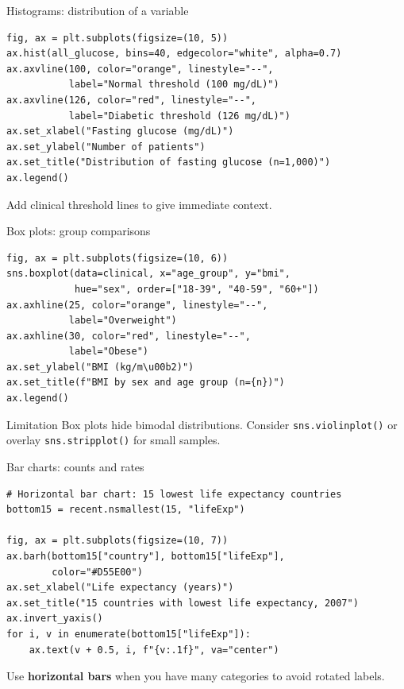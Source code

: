 \documentclass[aspectratio=169,11pt]{beamer}
\begin{document}
\begin{frame}[fragile]{Histograms: distribution of a variable}
\begin{verbatim}
fig, ax = plt.subplots(figsize=(10, 5))
ax.hist(all_glucose, bins=40, edgecolor="white", alpha=0.7)
ax.axvline(100, color="orange", linestyle="--",
           label="Normal threshold (100 mg/dL)")
ax.axvline(126, color="red", linestyle="--",
           label="Diabetic threshold (126 mg/dL)")
ax.set_xlabel("Fasting glucose (mg/dL)")
ax.set_ylabel("Number of patients")
ax.set_title("Distribution of fasting glucose (n=1,000)")
ax.legend()
\end{verbatim}

\vspace{4pt}
Add \alert{clinical threshold lines} to give immediate context.
\end{frame}

\begin{frame}[fragile]{Box plots: group comparisons}
\begin{verbatim}
fig, ax = plt.subplots(figsize=(10, 6))
sns.boxplot(data=clinical, x="age_group", y="bmi",
            hue="sex", order=["18-39", "40-59", "60+"])
ax.axhline(25, color="orange", linestyle="--",
           label="Overweight")
ax.axhline(30, color="red", linestyle="--",
           label="Obese")
ax.set_ylabel("BMI (kg/m\u00b2)")
ax.set_title(f"BMI by sex and age group (n={n})")
ax.legend()
\end{verbatim}

\begin{alertblock}{Limitation}
Box plots hide bimodal distributions. Consider \texttt{sns.violinplot()} or overlay \texttt{sns.stripplot()} for small samples.
\end{alertblock}
\end{frame}

\begin{frame}[fragile]{Bar charts: counts and rates}
\begin{verbatim}
# Horizontal bar chart: 15 lowest life expectancy countries
bottom15 = recent.nsmallest(15, "lifeExp")

fig, ax = plt.subplots(figsize=(10, 7))
ax.barh(bottom15["country"], bottom15["lifeExp"],
        color="#D55E00")
ax.set_xlabel("Life expectancy (years)")
ax.set_title("15 countries with lowest life expectancy, 2007")
ax.invert_yaxis()
for i, v in enumerate(bottom15["lifeExp"]):
    ax.text(v + 0.5, i, f"{v:.1f}", va="center")
\end{verbatim}

Use \textbf{horizontal bars} when you have many categories to avoid rotated labels.
\end{frame}
\end{document}
